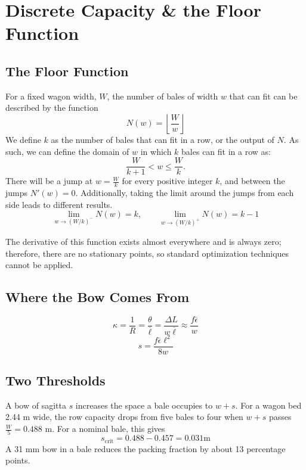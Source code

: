 \section{Discrete Capacity \& the Floor Function}
\subsection{The Floor Function}
For a fixed wagon width, $W$, the number of bales of width $w$ that can fit can be described by the function
\[
N(w)=\left\lfloor\frac{W}{w}\right\rfloor
\]
We define $k$ as the number of bales that can fit in a row, or the output of $N$. As such, we can define the domain of $w$ in which $k$ bales can fit in a row as:
\[
\frac{W}{k+1}<w\leq\frac{W}{k}.
\]
There will be a jump at $w=\frac{W}{k}$ for every positive integer $k$, and between the jumps $N'(w)=0$. Additionally, taking the limit around the jumps from each side leads to different results.
\[
\lim_{w\rightarrow(W/k)^-}N(w)=k, \qquad \lim_{w\rightarrow(W/k)^+}N(w)=k-1
\]

The derivative of this function exists almost everywhere and is always zero; therefore, there are no stationary points, so standard optimization techniques cannot be applied.

\subsection{Where the Bow Comes From}
\[
\kappa=\frac{1}{R}=\frac{\theta}{\overline{\ell}}=\frac{\Delta L}{w\overline{\ell}}\approx\frac{f\overline{\epsilon}}{w}
\]
\[
s=\frac{f\overline{\epsilon}\ell^2}{8w}
\]

\subsection{Two Thresholds}
A bow of sagitta $s$ increases the space a bale occupies to $w+s$. For a wagon bed 2.44 m wide, the row capacity drops from five bales to four when $w+s$ passes $\frac{W}{5}=0.488$ m. For a nominal bale, this gives
\[
s_{\text{crit}}=0.488-0.457=0.031\text{m}
\]
A 31 mm bow in a bale reduces the packing fraction by about 13 percentage points.

